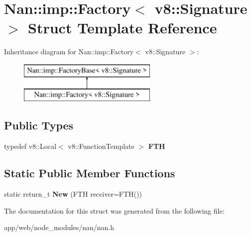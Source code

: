 \hypertarget{struct_nan_1_1imp_1_1_factory_3_01v8_1_1_signature_01_4}{}\section{Nan\+:\+:imp\+:\+:Factory$<$ v8\+:\+:Signature $>$ Struct Template Reference}
\label{struct_nan_1_1imp_1_1_factory_3_01v8_1_1_signature_01_4}
Inheritance diagram for Nan\+:\+:imp\+:\+:Factory$<$ v8\+:\+:Signature $>$\+:\begin{figure}[H]
\begin{center}
\leavevmode
\includegraphics[height=2.000000cm]{struct_nan_1_1imp_1_1_factory_3_01v8_1_1_signature_01_4}
\end{center}
\end{figure}
\subsection*{Public Types}
\begin{DoxyCompactItemize}
\item 
\mbox{\label{struct_nan_1_1imp_1_1_factory_3_01v8_1_1_signature_01_4_ad0f82e5611b80721782732d7ee436514}} 
typedef v8\+::\+Local$<$ v8\+::\+Function\+Template $>$ {\bfseries F\+TH}
\end{DoxyCompactItemize}
\subsection*{Static Public Member Functions}
\begin{DoxyCompactItemize}
\item 
\mbox{\label{struct_nan_1_1imp_1_1_factory_3_01v8_1_1_signature_01_4_adf28b8a60758dfd8cceec82b854c451f}} 
static return\+\_\+t {\bfseries New} (F\+TH receiver=F\+TH())
\end{DoxyCompactItemize}


The documentation for this struct was generated from the following file\+:\begin{DoxyCompactItemize}
\item 
app/web/node\+\_\+modules/nan/nan.\+h\end{DoxyCompactItemize}
